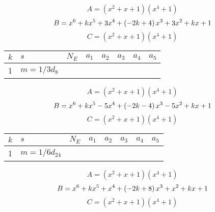 \documentclass{amsart}
\begin{document}
$$A=(x^2
 + x
 + 1)(x^4
 + 1)$$
$$B=x^6
 + k\*x^5
 + 3\*x^4
 + \left(-2\*k
 + 4\right) \*x^3
 + 3\*x^2
 + k\*x
 + 1$$
$$C=(x^2
 + x
 + 1)(x^4
 + 1)$$
\begin{longtable}{|l|l|l|lllll|}
\hline
$k$ & $s$ & $N_E$ & $a_1$ & $a_2$ & $a_3$ & $a_4$ & $a_5$\\
\hline
1&$m=1/3d_{8}$&&\multicolumn{5}{c|}{}\\
\hline
\end{longtable}
$$A=(x^2
 + x
 + 1)(x^4
 + 1)$$
$$B=x^6
 + k\*x^5
 - 5\*x^4
 + \left(-2\*k
 - 4\right) \*x^3
 - 5\*x^2
 + k\*x
 + 1$$
$$C=(x^2
 + x
 + 1)(x^4
 + 1)$$
\begin{longtable}{|l|l|l|lllll|}
\hline
$k$ & $s$ & $N_E$ & $a_1$ & $a_2$ & $a_3$ & $a_4$ & $a_5$\\
\hline
1&$m=1/6d_{24}$&&\multicolumn{5}{c|}{}\\
\hline
\end{longtable}
$$A=(x^2
 + x
 + 1)(x^4
 + 1)$$
$$B=x^6
 + k\*x^5
 + x^4
 + \left(-2\*k
 + 8\right) \*x^3
 + x^2
 + k\*x
 + 1$$
$$C=(x^2
 + x
 + 1)(x^4
 + 1)$$
\end{document}
